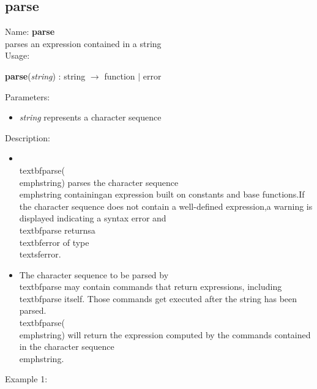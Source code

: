 \subsection{parse}
\label{labparse}
\noindent Name: \textbf{parse}\\
parses an expression contained in a string\\
\noindent Usage: 
\begin{center}
\textbf{parse}(\emph{string}) : \textsf{string} $\rightarrow$ \textsf{function} $|$ \textsf{error}\\
\end{center}
Parameters: 
\begin{itemize}
\item \emph{string} represents a character sequence
\end{itemize}
\noindent Description: \begin{itemize}

\item \\textbf{parse}(\\emph{string}) parses the character sequence \\emph{string} containing\n   an expression built on constants and base functions.\n    \n   If the character sequence does not contain a well-defined expression,\n   a warning is displayed indicating a syntax error and \\textbf{parse} returns\n   a \\textbf{error} of type \\textsf{error}.\n
\item The character sequence to be parsed by \\textbf{parse} may contain commands that \n   return expressions, including \\textbf{parse} itself. Those commands get executed after the string has been parsed.\n   \\textbf{parse}(\\emph{string}) will return the expression computed by the commands contained in the character \n   sequence \\emph{string}.\n\end{itemize}
\noindent Example 1: 
\begin{center}\begin{minipage}{15cm}\begin{Verbatim}[frame=single]
\end{Verbatim}
\end{minipage}\end{center}
